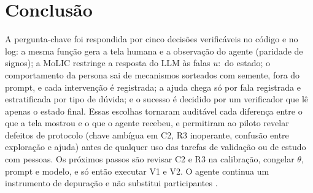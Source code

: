 \section{Conclusão}
A pergunta-chave foi respondida por cinco decisões verificáveis no código e no log: a mesma função gera a tela humana e a observação do agente (paridade de signos); a MoLIC restringe a resposta do LLM às falas $u{:}$ do estado; o comportamento da persona sai de mecanismos sorteados com semente, fora do prompt, e cada intervenção é registrada; a ajuda chega só por fala registrada e estratificada por tipo de dúvida; e o sucesso é decidido por um verificador que lê apenas o estado final. Essas escolhas tornaram auditável cada diferença entre o que a tela mostrou e o que o agente recebeu, e permitiram ao piloto revelar defeitos de protocolo (chave ambígua em C2, R3 inoperante, confusão entre exploração e ajuda) antes de qualquer uso das tarefas de validação ou de estudo com pessoas. Os próximos passos são revisar C2 e R3 na calibração, congelar $\theta$, prompt e modelo, e só então executar V1 e V2. O agente continua um instrumento de depuração e não substitui participantes \cite{lu2025uxagent}.
